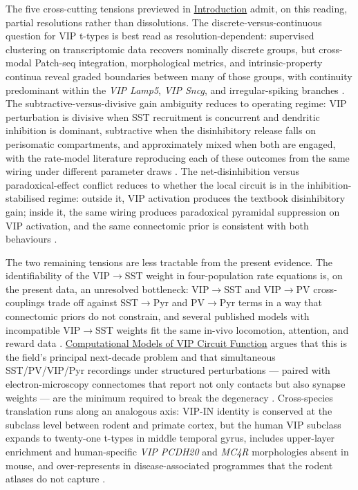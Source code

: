 \documentclass[11pt]{article}
\let\origrightarrow\rightarrow
\def\rightarrow{\ensuremath{\origrightarrow}}
\begin{document}
The five cross-cutting tensions previewed in \href{/}{Introduction} admit, on this reading, partial resolutions rather than dissolutions. The discrete-versus-continuous question for VIP t-types is best read as resolution-dependent: supervised clustering on transcriptomic data recovers nominally discrete groups, but cross-modal Patch-seq integration, morphological metrics, and intrinsic-property continua reveal graded boundaries between many of those groups, with continuity predominant within the \textit{VIP Lamp5}, \textit{VIP Sncg}, and irregular-spiking branches \citep{Tasic2018, Gouwens2020a, Pronneke2015, Apicella2022, Emmenegger2018, Schneidermizell2025}. The subtractive-versus-divisive gain ambiguity reduces to operating regime: VIP perturbation is divisive when SST recruitment is concurrent and dendritic inhibition is dominant, subtractive when the disinhibitory release falls on perisomatic compartments, and approximately mixed when both are engaged, with the rate-model literature reproducing each of these outcomes from the same wiring under different parameter draws \citep{Kuchibhotla2017, Hertag2019, Litwinkumar2016, Garciadelmolino2017, Veit2023, Tahvili2025a, Tahvili2025b}. The net-disinhibition versus paradoxical-effect conflict reduces to whether the local circuit is in the inhibition-stabilised regime: outside it, VIP activation produces the textbook disinhibitory gain; inside it, the same wiring produces paradoxical pyramidal suppression on VIP activation, and the same connectomic prior is consistent with both behaviours \citep{Garciadelmolino2017, Sanzeni2020, Reimann2026, Hertag2019, Tahvili2025a, Tahvili2025b}.

The two remaining tensions are less tractable from the present evidence. The identifiability of the VIP\rightarrow SST weight in four-population rate equations is, on the present data, an unresolved bottleneck: VIP\rightarrow SST and VIP\rightarrow PV cross-couplings trade off against SST\rightarrow Pyr and PV\rightarrow Pyr terms in a way that connectomic priors do not constrain, and several published models with incompatible VIP\rightarrow SST weights fit the same in-vivo locomotion, attention, and reward data \citep{Hertag2019, Litwinkumar2016, Garciadelmolino2017, Veit2023, Reimann2026, Sabri2024}. \href{/computational-models}{Computational Models of VIP Circuit Function} argues that this is the field's principal next-decade problem and that simultaneous SST/PV/VIP/Pyr recordings under structured perturbations --- paired with electron-microscopy connectomes that report not only contacts but also synapse weights --- are the minimum required to break the degeneracy \citep{Reimann2026, Schneidermizell2025, Hertag2019, Bos2025}. Cross-species translation runs along an analogous axis: VIP-IN identity is conserved at the subclass level between rodent and primate cortex, but the human VIP subclass expands to twenty-one t-types in middle temporal gyrus, includes upper-layer enrichment and human-specific \textit{VIP PCDH20} and \textit{MC4R} morphologies absent in mouse, and over-represents in disease-associated programmes that the rodent atlases do not capture \citep{Hodge2019, Boldog2018, Chartrand2023, Bakken2021a, Bakken2021b, Krienen2020, Lee2023a}.
\end{document}
